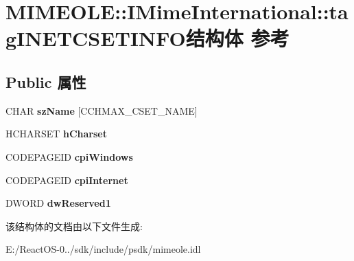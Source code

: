 \hypertarget{struct_m_i_m_e_o_l_e_1_1_i_mime_international_1_1tag_i_n_e_t_c_s_e_t_i_n_f_o}{}\section{M\+I\+M\+E\+O\+LE\+:\+:I\+Mime\+International\+:\+:tag\+I\+N\+E\+T\+C\+S\+E\+T\+I\+N\+F\+O结构体 参考}
\label{struct_m_i_m_e_o_l_e_1_1_i_mime_international_1_1tag_i_n_e_t_c_s_e_t_i_n_f_o}
\subsection*{Public 属性}
\begin{DoxyCompactItemize}
\item 
\mbox{\label{struct_m_i_m_e_o_l_e_1_1_i_mime_international_1_1tag_i_n_e_t_c_s_e_t_i_n_f_o_adcaa1789cb03a5a4f8a8cc5348b927cb}} 
C\+H\+AR {\bfseries sz\+Name} \mbox{[}C\+C\+H\+M\+A\+X\+\_\+\+C\+S\+E\+T\+\_\+\+N\+A\+ME\mbox{]}
\item 
\mbox{\label{struct_m_i_m_e_o_l_e_1_1_i_mime_international_1_1tag_i_n_e_t_c_s_e_t_i_n_f_o_aeaa7e980de401a264b41a8cfbe5cedcb}} 
H\+C\+H\+A\+R\+S\+ET {\bfseries h\+Charset}
\item 
\mbox{\label{struct_m_i_m_e_o_l_e_1_1_i_mime_international_1_1tag_i_n_e_t_c_s_e_t_i_n_f_o_a78934025f991b00d2dc6fea5ce6cbd84}} 
C\+O\+D\+E\+P\+A\+G\+E\+ID {\bfseries cpi\+Windows}
\item 
\mbox{\label{struct_m_i_m_e_o_l_e_1_1_i_mime_international_1_1tag_i_n_e_t_c_s_e_t_i_n_f_o_a52e117f2f79f6c9ac7413c388283b52c}} 
C\+O\+D\+E\+P\+A\+G\+E\+ID {\bfseries cpi\+Internet}
\item 
\mbox{\label{struct_m_i_m_e_o_l_e_1_1_i_mime_international_1_1tag_i_n_e_t_c_s_e_t_i_n_f_o_a62beed84629070ce26bba37749639476}} 
D\+W\+O\+RD {\bfseries dw\+Reserved1}
\end{DoxyCompactItemize}


该结构体的文档由以下文件生成\+:\begin{DoxyCompactItemize}
\item 
E\+:/\+React\+O\+S-\/0../sdk/include/psdk/mimeole.\+idl\end{DoxyCompactItemize}

